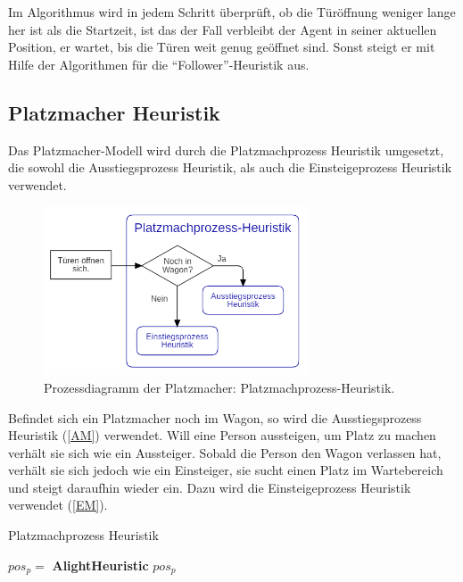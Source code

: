 Im Algorithmus wird in jedem Schritt überprüft, ob die Türöffnung weniger lange her ist als die Startzeit, ist das der Fall verbleibt der Agent in seiner aktuellen Position, er wartet, bis die Türen weit genug geöffnet sind. Sonst steigt er mit Hilfe der Algorithmen für die "`Follower"'-Heuristik aus.

\subsection{Platzmacher Heuristik}
Das Platzmacher-Modell wird durch die Platzmachprozess Heuristik umgesetzt, die sowohl die Ausstiegsprozess Heuristik, als auch die Einsteigeprozess Heuristik verwendet.
\begin{figure}[H]
	\centering
		\includegraphics[width=0.7\textwidth]{pictures/model/algorithm/spacemaker/spacemaker_heuristic.png}
	\caption{Prozessdiagramm der Platzmacher: Platzmachprozess-Heuristik.}
	\label{fig:PH}
\end{figure}
Befindet sich ein Platzmacher noch im Wagon, so wird die Ausstiegsprozess Heuristik (\ref{AM}) verwendet. Will eine Person aussteigen, um Platz zu machen verhält sie sich wie ein Aussteiger. Sobald die Person den Wagon verlassen hat, verhält sie sich jedoch wie ein Einsteiger, sie sucht einen Platz im Wartebereich und steigt daraufhin wieder ein. Dazu wird die Einsteigeprozess Heuristik verwendet (\ref{EM}).

\begin{algorithm} [H]
	\caption{Platzmachprozess Heuristik}
	
	\SpacemakerHeuristic{} {
		  {
			$pos_p = $ \textbf{AlightHeuristic}
		} 
		\Return $pos_p$
	}
\end{algorithm}

